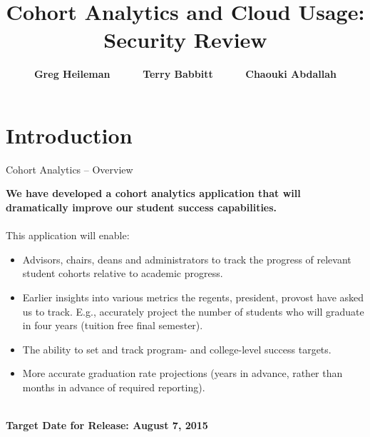 \documentclass[t,handout]{beamer}   %
\title[Cohort Analytics]
{Cohort Analytics and Cloud Usage: Security Review}
\author[Heileman, Babbitt \& Abdallah] %
{\bf Greg Heileman \ \ \ \ \ Terry Babbitt \ \ \ \ \ Chaouki Abdallah}
\institute[UNM]
{Application Development Team \\
Academic Affairs \\
University of New Mexico}
\date[June 26, 2015]
\begin{document}
\begin{frame}
  \titlepage
\end{frame}



%

\section{Introduction}

\begin{frame}{Cohort Analytics -- Overview}%

\vspace*{-0.2in}
\textbf{We have developed a cohort analytics application that will dramatically improve our student success capabilities.}~\\~\\
\pause
This application will enable:
\begin{itemize}
\item Advisors, chairs, deans and administrators to track the progress of relevant student cohorts relative to academic progress. 
\pause
\item Earlier insights into various metrics the regents, president, provost have asked us to track.  E.g., accurately project the number of students who will graduate in four years (tuition free final semester).
\pause
\item The ability to set and track program- and college-level success targets.
\pause
\item More accurate graduation rate projections (years in advance, rather than months in advance of required reporting). 
\end{itemize}~\\
\pause
{\bf Target Date for Release: August 7, 2015}
\end{frame}
\end{document}
